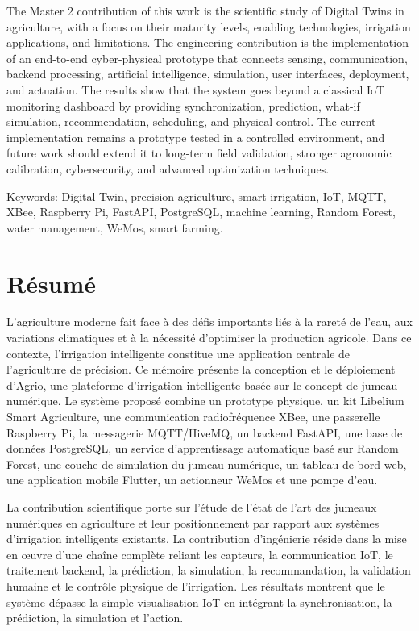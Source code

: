 The Master 2 contribution of this work is the scientific study of Digital Twins in agriculture, with a focus on their maturity levels, enabling technologies, irrigation applications, and limitations. The engineering contribution is the implementation of an end-to-end cyber-physical prototype that connects sensing, communication, backend processing, artificial intelligence, simulation, user interfaces, deployment, and actuation. The results show that the system goes beyond a classical IoT monitoring dashboard by providing synchronization, prediction, what-if simulation, recommendation, scheduling, and physical control. The current implementation remains a prototype tested in a controlled environment, and future work should extend it to long-term field validation, stronger agronomic calibration, cybersecurity, and advanced optimization techniques.

Keywords: Digital Twin, precision agriculture, smart irrigation, IoT, MQTT, XBee, Raspberry Pi, FastAPI, PostgreSQL, machine learning, Random Forest, water management, WeMos, smart farming.

\chapter*{Résumé}

L’agriculture moderne fait face à des défis importants liés à la rareté de l’eau, aux variations climatiques et à la nécessité d’optimiser la production agricole. Dans ce contexte, l’irrigation intelligente constitue une application centrale de l’agriculture de précision. Ce mémoire présente la conception et le déploiement d’Agrio, une plateforme d’irrigation intelligente basée sur le concept de jumeau numérique. Le système proposé combine un prototype physique, un kit Libelium Smart Agriculture, une communication radiofréquence XBee, une passerelle Raspberry Pi, la messagerie MQTT/HiveMQ, un backend FastAPI, une base de données PostgreSQL, un service d’apprentissage automatique basé sur Random Forest, une couche de simulation du jumeau numérique, un tableau de bord web, une application mobile Flutter, un actionneur WeMos et une pompe d’eau.

La contribution scientifique porte sur l’étude de l’état de l’art des jumeaux numériques en agriculture et leur positionnement par rapport aux systèmes d’irrigation intelligents existants. La contribution d’ingénierie réside dans la mise en œuvre d’une chaîne complète reliant les capteurs, la communication IoT, le traitement backend, la prédiction, la simulation, la recommandation, la validation humaine et le contrôle physique de l’irrigation. Les résultats montrent que le système dépasse la simple visualisation IoT en intégrant la synchronisation, la prédiction, la simulation et l’action.

